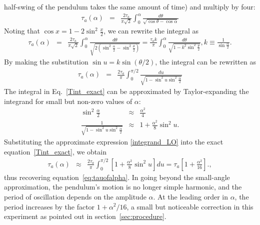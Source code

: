 \documentclass{revtex4}
\begin{document}
half-swing of the pendulum takes the same amount of time) and multiply by
four:
\begin{eqnarray}
  \tau_a(\alpha) &=& \frac{2\tau_a}{\pi\sqrt{2}} \int_{0}^{\alpha}
  \frac{d\theta}{\sqrt{\cos \theta - \cos \alpha} }
\end{eqnarray} 
Noting that $\cos x = 1 - 2\sin^2 \frac{x}{2}$, we can rewrite the
integral as
\begin{eqnarray}
  \tau_a(\alpha) &=& \frac{2\tau_a}{\pi\sqrt{2}} \int_{0}^{\alpha}
  \frac{d\theta}{\sqrt{2(\sin^2 \frac{\alpha}{2} - \sin^2
      \frac{\theta}{2} )}} = \frac{\tau_a k}{\pi}
  \int_{0}^{\alpha} \frac{d\theta}{\sqrt{1-k^2 \sin^2
      \frac{\theta}{2}}}, k \equiv \frac{1}{\sin \frac{\alpha}{2}}.
\end{eqnarray}
By making the substitution $\sin u = k \sin (\theta/2)$, the integral
can be rewritten as
\begin{eqnarray}
  \tau_a(\alpha) &=& \frac{2 \tau_a}{\pi} \int_{0}^{\pi/2}
  \frac{du}{\sqrt{1-\sin^2 u \sin^2 \frac{\alpha}{2}}} \label{Tint_exact}
\end{eqnarray}
The integral in Eq.~\eqref{Tint_exact} can be approximated by
Taylor-expanding the integrand for small but non-zero values of $\alpha$:
\begin{eqnarray} 
  \sin^2 \frac{\alpha}{2} &\approx& \frac{\alpha^2}{4}\nonumber \\
  \frac{1}{\sqrt{1-\sin^2 u \sin^2 \frac{\alpha}{2}}} &\approx & 1 +
  \frac{\alpha^2}{8} \sin^2 u. \label{integrand_LO} 
\end{eqnarray}
Substituting the approximate expression \eqref{integrand_LO} into the
exact equation~\eqref{Tint_exact}, we obtain 
\begin{eqnarray}
  \tau_a(\alpha) &\approx& \frac{2\tau_a}{\pi} \int_{0}^{\pi/2} \left[1 + \frac{\alpha^2}{8}
  \sin^2 u \right]du = \tau_a \left[ 1 + \frac{ \alpha^2}{16}
\right]. \label{finiteamplitudecorrection},
\end{eqnarray}
thus recovering equation~\eqref{eq:tauofalpha}. In going beyond the small-angle approximation, the pendulum's motion
is no longer simple harmonic, and the period of oscillation depends on
the amplitude $\alpha$. At the leading order in $\alpha$, the period
increases by the factor $1 + \alpha^2/16$, a small but noticeable
correction in this experiment as pointed out in section~\ref{sec:procedure}.

%
\end{document}
